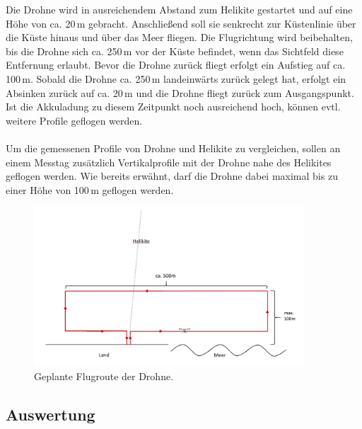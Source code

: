 \documentclass[a4paper,11pt,DIV=calc,tablecaptionabove,headinclude,twoside]{article}
\begin{document}
Die Drohne wird in ausreichendem Abstand zum Helikite gestartet und auf eine Höhe von ca. 20\,m gebracht. Anschließend soll sie senkrecht zur Küstenlinie über die Küste hinaus und über das Meer fliegen. Die Flugrichtung wird beibehalten, bis die Drohne sich ca. 250\,m vor der Küste befindet, wenn das Sichtfeld diese Entfernung erlaubt. Bevor die Drohne zurück fliegt erfolgt ein Aufstieg auf ca. 100\,m. Sobald die Drohne ca. 250\,m landeinwärts zurück gelegt hat, erfolgt ein Absinken zurück auf ca. 20\,m und die Drohne fliegt zurück zum Ausgangspunkt. Ist die Akkuladung zu diesem Zeitpunkt noch ausreichend hoch, können evtl. weitere Profile geflogen werden. \\\\
Um die gemessenen Profile von Drohne und Helikite zu vergleichen, sollen an einem Messtag zusätzlich Vertikalprofile mit der Drohne nahe des Helikites geflogen werden. Wie bereits erwähnt, darf die Drohne dabei maximal bis zu einer Höhe von 100\,m geflogen werden. 

\begin{figure}[t]
\centering
\includegraphics[width=0.9\textwidth]{Flugroute.png}
\captionsetup{width=11cm}
\caption{Geplante Flugroute der Drohne.}
\label{flugroute}
\end{figure}

\subsection{Auswertung}
\end{document}
